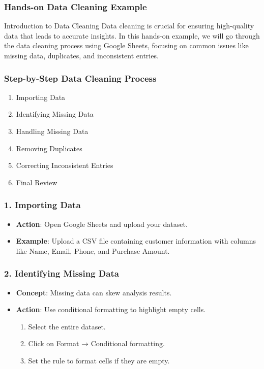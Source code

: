 \documentclass[aspectratio=169]{beamer}
\begin{document}
\begin{frame}[fragile]
    \frametitle{Hands-on Data Cleaning Example}
    \begin{block}{Introduction to Data Cleaning}
        Data cleaning is crucial for ensuring high-quality data that leads to accurate insights. In this hands-on example, we will go through the data cleaning process using Google Sheets, focusing on common issues like missing data, duplicates, and inconsistent entries.
    \end{block}
\end{frame}

\begin{frame}[fragile]
    \frametitle{Step-by-Step Data Cleaning Process}

    \begin{enumerate}
        \item Importing Data
        \item Identifying Missing Data
        \item Handling Missing Data
        \item Removing Duplicates
        \item Correcting Inconsistent Entries
        \item Final Review
    \end{enumerate}
\end{frame}

\begin{frame}[fragile]
    \frametitle{1. Importing Data}
    \begin{itemize}
        \item \textbf{Action}: Open Google Sheets and upload your dataset.
        \item \textbf{Example}: Upload a CSV file containing customer information with columns like Name, Email, Phone, and Purchase Amount.
    \end{itemize}
\end{frame}

\begin{frame}[fragile]
    \frametitle{2. Identifying Missing Data}
    \begin{itemize}
        \item \textbf{Concept}: Missing data can skew analysis results.
        \item \textbf{Action}: Use conditional formatting to highlight empty cells.
            \begin{enumerate}
                \item Select the entire dataset.
                \item Click on Format → Conditional formatting.
                \item Set the rule to format cells if they are empty.
            \end{enumerate}
    \end{itemize}
\end{frame}
\end{document}
